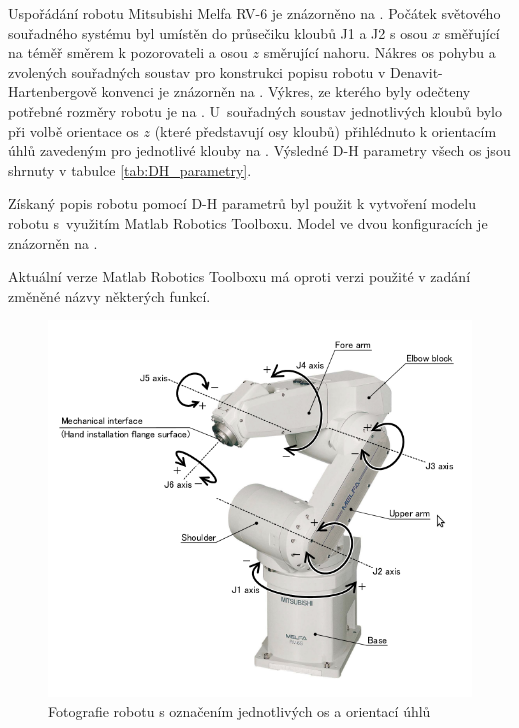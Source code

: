 \documentclass[11pt,oneside,a4paper,pdftex]{article}   %
\begin{document}
\noindent Uspořádání robotu Mitsubishi Melfa RV-6 je znázorněno na . Počátek světového souřadného systému
byl umístěn do průsečiku kloubů J1 a J2 s osou $x$ směřující na  téměř směrem k po\-zo\-ro\-va\-te\-li
a osou $z$ směrující nahoru. Nákres os pohybu a zvolených souřadných soustav pro konstrukci popisu
robotu v Denavit-Hartenbergově konvenci je zná\-zo\-rněn na . Výkres, ze kterého
byly odečteny potřebné rozměry robotu je na . U~souřadných
soustav jednotlivých kloubů bylo při volbě orientace os $z$ (které představují osy kloubů)
přihlédnuto k orientacím úhlů zavedeným pro jednotlivé klouby na .
Výsledné D-H parametry všech os jsou shrnuty v tabulce \ref{tab:DH_parametry}.

Získaný popis robotu pomocí D-H parametrů byl použit k vytvoření modelu robotu s~využitím Matlab Robotics Toolboxu.
Model ve dvou konfiguracích je znázorněn na .

Aktuální verze Matlab Robotics Toolboxu má oproti verzi použité v zadání změněné názvy
některých funkcí.

\begin{figure}[htb]
	\centering
	\includegraphics[width=15.3cm]{pictures/picture-Mitsubishi-Melfa-RV-6S-s_popisky.png}
	\caption{Fotografie robotu s označením jednotlivých os a orientací úhlů}
	\label{fig:foto}
\end{figure}
\end{document}
